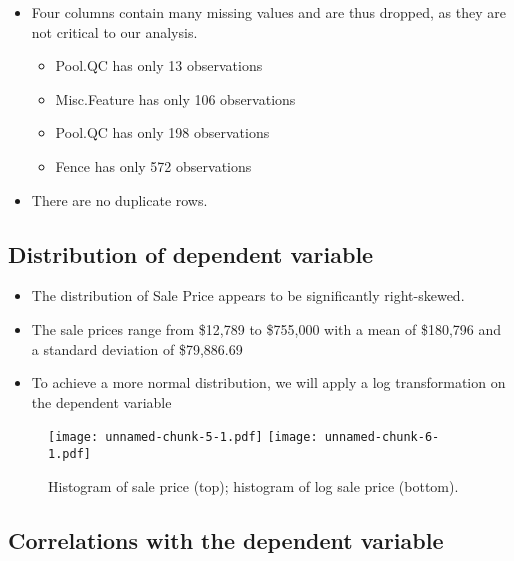 \documentclass[aoas]{imsart}
\providecommand{\tightlist}{%
  \setlength{\itemsep}{0pt}\setlength{\parskip}{0pt}}
\numberwithin{equation}{section}
\theoremstyle{plain}
\theoremstyle{remark}
\begin{document}
\begin{itemize}
\tightlist
\item
  Four columns contain many missing values and are thus dropped, as they are not critical to our analysis.
  \vspace*{0.2cm}
  \begin{itemize}
  \tightlist
  \item
    Pool.QC has only 13 observations
  \item
    Misc.Feature has only 106 observations
  \item
    Pool.QC has only 198 observations
  \item
    Fence has only 572 observations
  \end{itemize}
\item
\vspace*{0.2cm}
  There are no duplicate rows.
\end{itemize}

\hypertarget{distribution-of-dependent-variable}{%
\subsection{Distribution of dependent
variable}\label{distribution-of-dependent-variable}}

\begin{itemize}
\tightlist
\item
  The distribution of Sale Price appears to be significantly right-skewed.
\item
  The sale prices range from \$12,789 to \$755,000 with a mean of
  \$180,796 and a standard deviation of \$79,886.69
\item
  To achieve a more normal distribution, we will apply a log
  transformation on the dependent variable
\end{itemize}

\begin{figure}
\centering
\texttt{[image: unnamed-chunk-5-1.pdf]}
\texttt{[image: unnamed-chunk-6-1.pdf]}
\caption{Histogram of sale price (top); histogram of log sale price (bottom).\label{}}
\end{figure}

\hfill\break

\hypertarget{correlations-with-the-dependent-variable}{%
\subsection{Correlations with the dependent
variable}\label{correlations-with-the-dependent-variable}}
\end{document}
